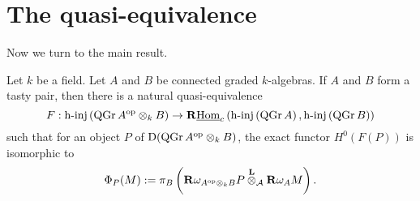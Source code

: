 \section{The quasi-equivalence}

Now we turn to the main result. 

\begin{theorem} \label{theorem: derived morita for NCP}
  Let \(k\) be a field. Let \(A\) and \(B\) be connected graded \(k\)-algebras. If \(A\) and \(B\) form a tasty pair, then there is a natural quasi-equivalence 
  \begin{displaymath}
    F : \operatorname{h-inj}\left(\operatorname{QGr}A^{\operatorname{op}} \otimes_k B\right) \to \mathbf{R}\underline{\operatorname{Hom}}_c\left( \operatorname{h-inj}\left(\operatorname{QGr}A\right), \operatorname{h-inj}\left(\operatorname{QGr}B\right) \right)
  \end{displaymath}
  such that for an object \(P\) of \(\mathrm{D}(\operatorname{QGr}A^{\operatorname{op}} \otimes_k B)\), the exact functor \(H^0(F(P))\) is isomorphic to 
  \begin{displaymath}
    \Phi_P(M) :=  \pi_B \left( \mathbf{R}\omega_{A^{\operatorname{op}} \otimes_k B} P \overset{\mathbf{L}}{\otimes}_{\mathcal A} \mathbf{R}\omega_A M \right).
  \end{displaymath}
\end{theorem}

